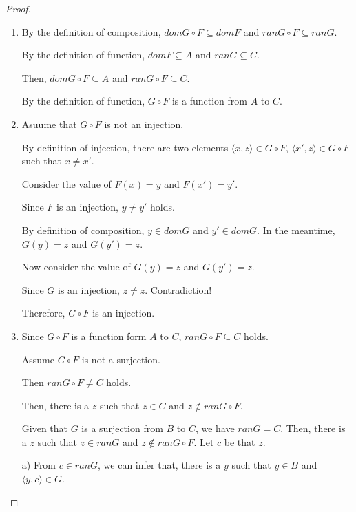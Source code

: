 \documentclass[12pt,a4paper,utf8]{article}
\theoremstyle{plain}
\begin{document}
\begin{proof}\
    \begin{enumerate}
       
        \item 
        By the definition of composition, $dom G \circ F \subseteq domF$ and $ran G \circ F \subseteq ranG$.
        
        By the definition of function, $domF \subseteq A$ and $ran G \subseteq C$.
        
        Then, $dom G \circ F \subseteq A$ and $ran G \circ F \subseteq C$.
        
        By the definition of function, $G \circ F$ is a function from $A$ to $C$.
        
        \item
        Asuume that $G \circ F$ is not an injection. 
        
        By definition of injection, there are two elements $\langle x,z \rangle \in G \circ F$, $\langle x',z \rangle \in G \circ F$ such that $x \neq x'$.
        
        Consider the value of $F(x)=y$ and $F(x')=y'$.
        
        Since $F$ is an injection, $y \neq y'$ holds.
        
        By definition of composition, $y \in domG$ and $y' \in domG$. In the meantime, $G(y)=z$ and $G(y')=z$.
        
        Now consider the value of $G(y)=z$ and $G(y')=z$.
        
        Since $G$ is an injection, $z \neq z$. Contradiction!
        
        Therefore, $G \circ F$ is an injection. 
        
        \item
        Since $G \circ F$ is a function form $A$ to $C$, $ranG\circ F \subseteq C$ holds.
        
        Assume $G \circ F$ is not a surjection.
        
        Then $ranG\circ F \neq C$ holds. 
        
        Then, there is a $z$ such that $z \in C$ and $z \notin ranG\circ F$.
        
        Given that $G$ is a surjection from $B$ to $C$, we have $ranG= C$. Then, there is a $z$ such that $z \in ranG$ and $z \notin ranG\circ F$. Let $c$ be that $z$.
        
        a) From $c \in ranG$, we can infer that, there is a $y$ such that $y \in B$ and $\langle y,c \rangle \in G$.
        

\end{enumerate}
\end{proof}
\end{document}
